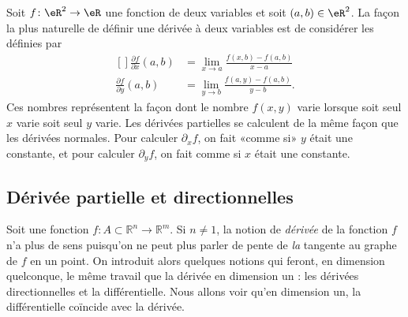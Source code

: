 Soit $f\colon \eR^2\to \eR$ une fonction de deux variables et soit $(a,b)\in\eR^2$. La façon la plus naturelle de définir une dérivée à deux variables est de considérer les  définies par
\begin{equation}
    \begin{aligned}[]
        \frac{ \partial f }{ \partial x }(a,b)&=\lim_{x\to a} \frac{ f(x,b)-f(a,b) }{ x-a }\\
        \frac{ \partial f }{ \partial y }(a,b)&=\lim_{y\to b} \frac{ f(a,y)-f(a,b) }{y-b}.
    \end{aligned}
\end{equation}
Ces nombres représentent la façon dont le nombre $f(x,y)$ varie lorsque soit seul $x$ varie soit seul $y$ varie. Les dérivées partielles se calculent de la même façon que les dérivées normales. Pour calculer $\partial_xf$, on fait «comme si» $y$ était une constante, et pour calculer $\partial_yf$, on fait comme si $x$ était une constante.

                    \subsection{Dérivée partielle et directionnelles}

Soit une fonction $f:A\subset \mathbb{R}^n \rightarrow \mathbb{R}^m$. Si $n\neq 1$, la notion de \emph{dérivée} de la fonction $f$ n'a plus de sens puisqu'on ne peut plus parler de pente de \emph{la} tangente au graphe de $f$ en un point. On introduit alors quelques notions qui feront, en dimension quelconque, le même travail que la dérivée en dimension un : les dérivées directionnelles et la différentielle. Nous allons voir qu'en dimension un, la différentielle coïncide avec la dérivée.

